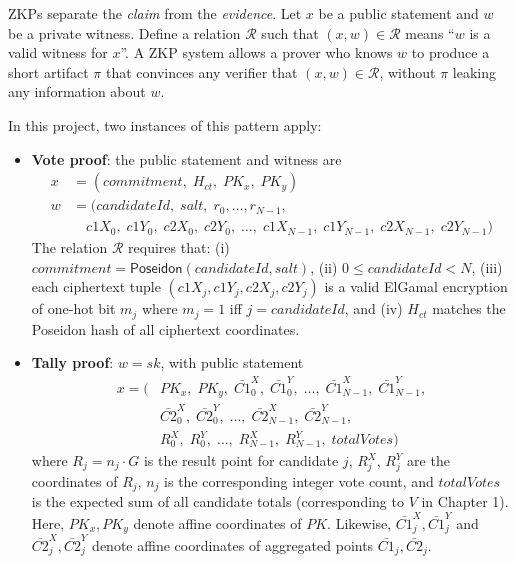 ZKPs separate the \emph{claim} from the \emph{evidence}. Let $x$ be a public statement and $w$ be a private witness. Define a relation $\mathcal{R}$ such that $(x, w) \in \mathcal{R}$ means ``$w$ is a valid witness for $x$''. A ZKP system allows a prover who knows $w$ to produce a short artifact $\pi$ that convinces any verifier that $(x, w) \in \mathcal{R}$, without $\pi$ leaking any information about $w$.

In this project, two instances of this pattern apply:
\begin{itemize}
    \item \textbf{Vote proof}: the public statement and witness are
    \begin{align*}
    x &= (\mathit{commitment},\; H_{ct},\; \mathit{PK}_x,\; \mathit{PK}_y) \\
    w &= (\mathit{candidateId},\; \mathit{salt},\; r_0, \dots, r_{N-1},\\
       &\quad \mathit{c1X}_0,\; \mathit{c1Y}_0,\; \mathit{c2X}_0,\; \mathit{c2Y}_0,\; \dots,\; \mathit{c1X}_{N-1},\; \mathit{c1Y}_{N-1},\; \mathit{c2X}_{N-1},\; \mathit{c2Y}_{N-1})
    \end{align*}
    The relation $\mathcal{R}$ requires that: (i) $\mathit{commitment} = \mathsf{Poseidon}(\mathit{candidateId}, \mathit{salt})$, (ii) $0 \le \mathit{candidateId} < N$, (iii) each ciphertext tuple $(\mathit{c1X}_j,\mathit{c1Y}_j,\mathit{c2X}_j,\mathit{c2Y}_j)$ is a valid ElGamal encryption of one-hot bit $m_j$ where $m_j=1$ iff $j=\mathit{candidateId}$, and (iv) $H_{ct}$ matches the Poseidon hash of all ciphertext coordinates.
    \item \textbf{Tally proof}: $w = \mathit{sk}$, with public statement
    \begin{equation*}
        \begin{split}
        x = (&\mathit{PK}_x,\; \mathit{PK}_y,\; \bar{C1}^{X}_0,\; \bar{C1}^{Y}_0,\; \dots,\; \bar{C1}^{X}_{N-1},\; \bar{C1}^{Y}_{N-1},\\
             &\bar{C2}^{X}_0,\; \bar{C2}^{Y}_0,\; \dots,\; \bar{C2}^{X}_{N-1},\; \bar{C2}^{Y}_{N-1},\\
             &R^{X}_0,\; R^{Y}_0,\; \dots,\; R^{X}_{N-1},\; R^{Y}_{N-1},\; \mathit{totalVotes})
        \end{split}
    \end{equation*}
    where $R_j = n_j \cdot G$ is the result point for candidate $j$, $R^{X}_j$, $R^{Y}_j$ are the coordinates of $R_j$, $n_j$ is the corresponding integer vote count, and $\mathit{totalVotes}$ is the expected sum of all candidate totals (corresponding to $V$ in Chapter 1). Here, $\mathit{PK}_x, \mathit{PK}_y$ denote affine coordinates of $\mathit{PK}$. Likewise, $\bar{C1}^{X}_j,\bar{C1}^{Y}_j$ and $\bar{C2}^{X}_j,\bar{C2}^{Y}_j$ denote affine coordinates of aggregated points $\bar{C1}_j,\bar{C2}_j$.
\end{itemize}

